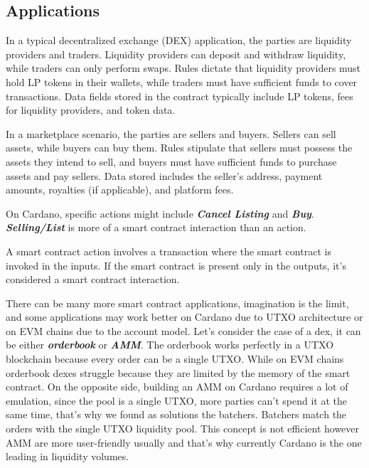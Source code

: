 \subsection{Applications}

In a typical decentralized exchange (DEX) application, the parties are liquidity providers and traders. Liquidity providers can deposit and withdraw liquidity, while traders can only perform swaps. Rules dictate that liquidity providers must hold LP tokens in their wallets, while traders must have sufficient funds to cover transactions. Data fields stored in the contract typically include LP tokens, fees for liquidity providers, and token data.

In a marketplace scenario, the parties are sellers and buyers. Sellers can sell assets, while buyers can buy them. Rules stipulate that sellers must possess the assets they intend to sell, and buyers must have sufficient funds to purchase assets and pay sellers. Data stored includes the seller's address, payment amounts, royalties (if applicable), and platform fees.

On Cardano, specific actions might include \textbf{\textit{Cancel Listing}} and \textbf{\textit{Buy}}. \textbf{\textit{Selling/List}} is more of a smart contract interaction than an action.

\begin{remark}
A smart contract action involves a transaction where the smart contract is invoked in the inputs. If the smart contract is present only in the outputs, it's considered a smart contract interaction.
\end{remark}

There can be many more smart contract applications, imagination is the limit, and some applications may work better on Cardano due to UTXO architecture or on EVM chains due to the account model.
Let's consider the case of a dex, it can be either \textbf{\textit{\gls{orderbook}}} or \textbf{\textit{\gls{AMM}}}. The orderbook works perfectly in a UTXO blockchain because every order can be a single UTXO. 
While on EVM chains orderbook dexes struggle because they are limited by the memory of the smart contract.
On the opposite side, building an AMM on Cardano requires a lot of emulation, since the pool is a single UTXO, more parties can't spend it at the same time, that's why we found as solutions the batchers.
Batchers match the orders with the single UTXO liquidity pool.
This concept is not efficient however AMM are more user-friendly usually and that's why currently Cardano is the one leading in liquidity volumes.

